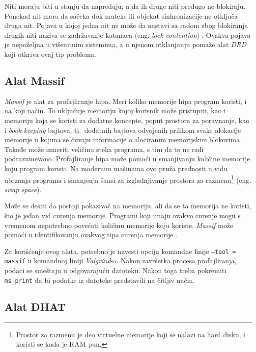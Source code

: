 \documentclass[12pt,oneside]{memoir}
\theoremstyle{plain}
\theoremstyle{definition}
\begin{document}
Niti moraju biti u stanju da napreduju, a da ih druge niti predugo ne blokiraju. Ponekad nit mora da sačeka dok muteks ili objekat sinhronizacije ne otključa druga nit. Pojava u kojoj jedna nit ne može da nastavi sa radom zbog blokiranja drugih niti naziva se zadržavanje katanaca (eng. \textit{lock contention})  \cite{Drd}. Ovakva pojava je nepoželjna u višenitnim sistemima, a u njenom otklanjanju pomaže alat \textit{DRD} koji otkriva ovaj tip problema. 

\subsection{Alat Massif}

\textit{Massif} je alat za profajliranje hipa. Meri koliko memorije hipa program koristi, i na koji način. To uključuje memoriju kojoj korisnik može pristupiti, kao i memoriju koja se koristi za dodatne koncepte, poput prostora za poravnanje, kao i \textit{book-keeping} bajtova, tj.~dodatnih bajtova odvojenih prilikom svake alokacije memorije u kojima se čuvaju informacije o alociranim memorijskim blokovima \cite{Massif}. Takođe može izmeriti veličinu steka  programa, s tim da to ne radi podrazumevano. Profajliranje hipa može pomoći u smanjivanju količine memorije koju program koristi. Na modernim mašinama ovo pruža prednosti u vidu ubrzanja programa i smanjenja šansi za izgladnjivanje prostora za razmenu\footnote{Prostor za razmenu je deo virtuelne memorije koji se nalazi na hard disku, i koristi se kada je RAM pun.} (eng. \textit{swap space})\cite{Massif}.

Može se desiti da postoji pokazivač na memoriju, ali da se ta memorija ne koristi, što je jedan vid curenja memorije. Programi koji imaju ovakvo curenje mogu s vremenom nepotrebno povećati količinu memorije koju koriste. \textit{Massif} može pomoći u identifikovanju ovakvog tipa curenja memorije \cite{Massif}.

Za korišćenje ovog alata, potrebno je navesti opciju komandne linije \texttt{--tool = massif} u komandnoj liniji \textit{Valgrind}-a. Nakon završetka procesa profajliranja, podaci se smeštaju u odgovarajuću datoteku. Nakon toga treba pokrenuti \texttt{ms\_print} da bi podatke iz datoteke predstavili na čitljiv način. 

\subsection{Alat DHAT}
\end{document}
